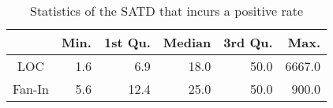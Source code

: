 \begin{table}[tb]
  \caption{Statistics of the SATD that incurs a positive rate}
  \label{tab:statistic}
  \centering

  \begin{tabular}{c|rrrrr}
  \hline
        & \textbf{Min.} & \textbf{1st Qu.} & \textbf{Median} & \textbf{3rd Qu.} & \textbf{Max.} \\
  \hline
    LOC  & 1.6 &   6.9 &  18.0  &   50.0 & 6667.0 \\
 Fan-In  & 5.6 &  12.4 &  25.0  &   50.0 &  900.0 \\
  \hline
  \end{tabular}
\end{table}





